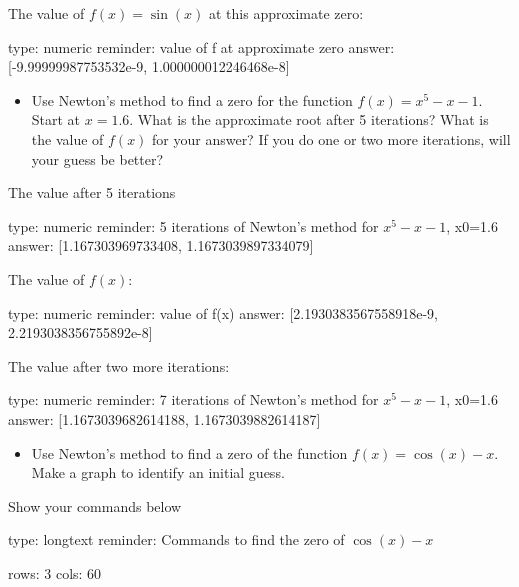 \documentclass[12pt]{article}
\begin{document}
The value of $f(x)=\sin(x)$ at this approximate zero:

\begin{answer}
    type: numeric
    reminder: value of f at approximate zero
    answer: [-9.99999987753532e-9, 1.000000012246468e-8]

\end{answer}

\begin{itemize}
\itemsep1pt\parskip0pt
\item
  Use Newton's method to find a zero for the function $f(x)=x^5-x-1$.
  Start at $x=1.6$. What is the approximate root after 5 iterations?
  What is the value of $f(x)$ for your answer? If you do one or two more
  iterations, will your guess be better?
\end{itemize}

The value after 5 iterations

\begin{answer}
    type: numeric
    reminder: 5 iterations of Newton's method for \( x^5 -x - 1 \), x0=1.6
    answer: [1.167303969733408, 1.1673039897334079]

\end{answer}

The value of $f(x)$:

\begin{answer}
    type: numeric
    reminder: value of f(x)
    answer: [2.1930383567558918e-9, 2.2193038356755892e-8]

\end{answer}

The value after two more iterations:

\begin{answer}
    type: numeric
    reminder: 7 iterations of Newton's method for \( x^5 -x - 1 \), x0=1.6
    answer: [1.1673039682614188, 1.1673039882614187]

\end{answer}

\begin{itemize}
\itemsep1pt\parskip0pt
\item
  Use Newton's method to find a zero of the function
  $f(x) = \cos(x) -   x$. Make a graph to identify an initial guess.
\end{itemize}

Show your commands below

\begin{answer}
type: longtext
reminder: Commands to find the zero of \( \cos(x) -x \)

rows: 3
cols: 60
\end{answer}
\end{document}
